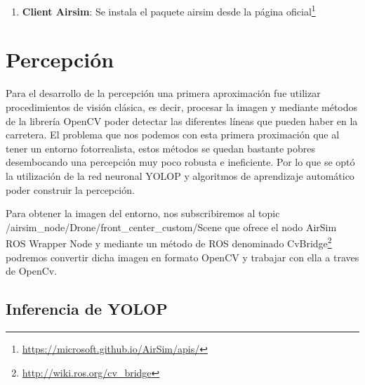 \begin{enumerate}
     \begin{code}  [H]
      \begin{lstlisting}
        roslaunch airsim_ros_pkgs airsim_node.launch output:=screen host:=192.168.2.16
      \end{lstlisting}
      \caption[comando]{Lanzamiento del nodo AirSim ROS Wrapper Node especificando la dirección IP del simulador}
      \label{cod:roslaunch}
    \end{code} 

    \item \textbf{Client Airsim}: Se instala el paquete airsim desde la página oficial\footnote{\url{https://microsoft.github.io/AirSim/apis/}}

  \end{enumerate}

\section{Percepción}
\label{sec:Percepción}
Para el desarrollo de la percepción una primera aproximación fue utilizar
procedimientos de visión clásica, es decir, procesar la imagen y mediante métodos de la librería OpenCV
poder detectar las diferentes líneas que pueden haber en la carretera. El problema que nos podemos con esta primera proximación que al tener un 
entorno fotorrealista, estos métodos se quedan bastante pobres desembocando una percepción muy poco robusta e ineficiente. Por lo que se optó la utilización
de la red neuronal YOLOP y algoritmos de aprendizaje automático poder construir la percepción. \newline

Para obtener la imagen del entorno, nos subscribiremos al topic /airsim\_node/Drone/front\_center\_custom/Scene que ofrece el nodo AirSim ROS Wrapper Node
 y mediante un método de ROS denominado CvBridge\footnote{\url{http://wiki.ros.org/cv_bridge}} podremos convertir dicha imagen en formato OpenCV y trabajar con ella a traves de OpenCv.\newline

\subsection{Inferencia de YOLOP}
\label{sec:Inferencia de YOLOP}

